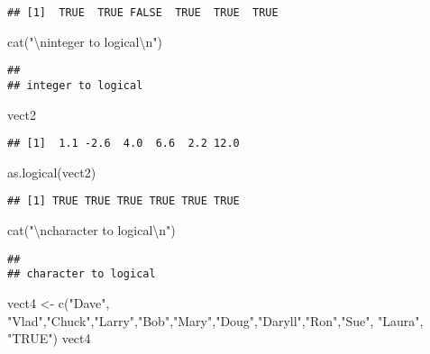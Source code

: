 \documentclass[
]{article}
\newenvironment{Shaded}{\begin{snugshade}}{\end{snugshade}}
\newcommand{\FunctionTok}[1]{\textcolor[rgb]{0.00,0.00,0.00}{#1}}
\newcommand{\NormalTok}[1]{#1}
\newcommand{\OtherTok}[1]{\textcolor[rgb]{0.56,0.35,0.01}{#1}}
\newcommand{\SpecialCharTok}[1]{\textcolor[rgb]{0.00,0.00,0.00}{#1}}
\newcommand{\StringTok}[1]{\textcolor[rgb]{0.31,0.60,0.02}{#1}}
\begin{document}
\begin{verbatim}
## [1]  TRUE  TRUE FALSE  TRUE  TRUE  TRUE
\end{verbatim}

\begin{Shaded}
\begin{Highlighting}[]
\FunctionTok{cat}\NormalTok{(}\StringTok{"}\SpecialCharTok{\textbackslash{}n}\StringTok{integer to logical}\SpecialCharTok{\textbackslash{}n}\StringTok{"}\NormalTok{)}
\end{Highlighting}
\end{Shaded}

\begin{verbatim}
## 
## integer to logical
\end{verbatim}

\begin{Shaded}
\begin{Highlighting}[]
\NormalTok{vect2}
\end{Highlighting}
\end{Shaded}

\begin{verbatim}
## [1]  1.1 -2.6  4.0  6.6  2.2 12.0
\end{verbatim}

\begin{Shaded}
\begin{Highlighting}[]
\FunctionTok{as.logical}\NormalTok{(vect2)}
\end{Highlighting}
\end{Shaded}

\begin{verbatim}
## [1] TRUE TRUE TRUE TRUE TRUE TRUE
\end{verbatim}

\begin{Shaded}
\begin{Highlighting}[]
\FunctionTok{cat}\NormalTok{(}\StringTok{"}\SpecialCharTok{\textbackslash{}n}\StringTok{character to logical}\SpecialCharTok{\textbackslash{}n}\StringTok{"}\NormalTok{)}
\end{Highlighting}
\end{Shaded}

\begin{verbatim}
## 
## character to logical
\end{verbatim}

\begin{Shaded}
\begin{Highlighting}[]
\NormalTok{vect4 }\OtherTok{\textless{}{-}} \FunctionTok{c}\NormalTok{(}\StringTok{"Dave"}\NormalTok{, }\StringTok{"Vlad"}\NormalTok{,}\StringTok{"Chuck"}\NormalTok{,}\StringTok{"Larry"}\NormalTok{,}\StringTok{"Bob"}\NormalTok{,}\StringTok{"Mary"}\NormalTok{,}\StringTok{"Doug"}\NormalTok{,}\StringTok{"Daryll"}\NormalTok{,}\StringTok{"Ron"}\NormalTok{,}\StringTok{"Sue"}\NormalTok{, }\StringTok{"Laura"}\NormalTok{, }\StringTok{"TRUE"}\NormalTok{)}
\NormalTok{vect4}
\end{Highlighting}
\end{Shaded}
\end{document}
